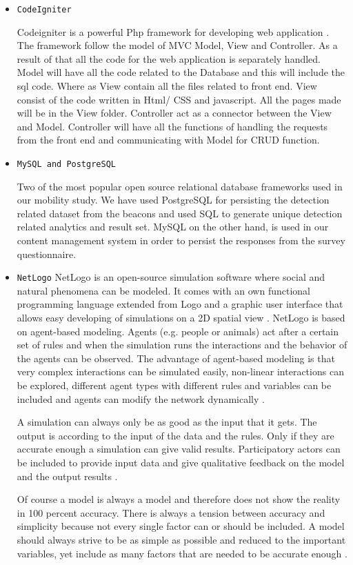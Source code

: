 \begin{itemize}
	\item \texttt{CodeIgniter\cite{CodeIgniter}}
	\par Codeigniter is a powerful Php framework for developing web application . The framework follow the model of MVC Model, View and Controller. As a result of that all the code for the web application is separately handled. Model will have all the code related to the Database and this will include the sql code. Where as View contain all the files related to front end. View consist of the code written in Html/ CSS and javascript. All the pages made will be in the View folder. Controller act as a connector between the View and Model. Controller will have all the functions of handling the requests from the front end and communicating with Model for CRUD function.
	
	\item \texttt{MySQL and PostgreSQL\cite{MySQL}\cite{PostgreSQL}}
	\par Two of the most popular open source relational database frameworks used in our mobility study. We have used PostgreSQL for persisting the detection related dataset from the beacons and used SQL to generate unique detection related analytics and result set. MySQL on the other hand, is used in our content management system  in order to persist the responses from the survey questionnaire.
	
	\item \texttt{NetLogo}
	NetLogo \cite{NetLogoHome} is an open-source simulation software where social and natural phenomena can be modeled. It comes with an own functional programming language extended from Logo and a graphic user interface that allows easy developing of simulations on a 2D spatial view \cite{NetlogoDocu}.
	NetLogo is based on agent-based modeling. Agents (e.g. people or animals) act after a certain set of rules and when the simulation runs the interactions and the behavior of the agents can be observed. The advantage of agent-based modeling is that very complex interactions can be simulated easily, non-linear interactions can be explored, different agent types with different rules and variables can be included and agents can modify the network dynamically \cite{berryman2010tutorials}. 
	\par A simulation can always only be as good as the input that it gets. The output is according to the input of the data and the rules. Only if they are accurate enough a simulation can give valid results. Participatory actors can be included to provide input data and give qualitative feedback on the model and the output results \cite{berryman2010tutorials}.
	\par Of course a model is always a model and therefore does not show the reality in 100 percent accuracy. There is always a tension between accuracy and simplicity because not every single factor can or should be included. A model should always strive to be as simple as possible and reduced to the important variables, yet include as many factors that are needed to be accurate enough \cite{carley2002simulating}.
	
\end{itemize}